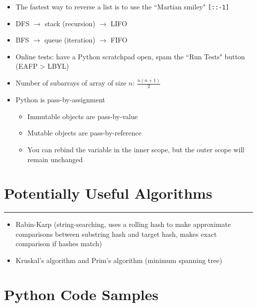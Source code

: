\documentclass[12pt]{article}
\begin{document}
\begin{itemize}
  \item The fastest way to reverse a list is to use the ``Martian smiley" \texttt{[::-1]}
  \item DFS $\rightarrow$ stack (recursion) $\rightarrow$ LIFO
  \item BFS $\rightarrow$ queue (iteration) $\rightarrow$ FIFO
  \item Online tests: have a Python scratchpad open, spam the ``Run Tests" button (EAFP > LBYL)
  \item Number of subarrays of array of size $n$: $\frac{n(n+1)}{2}$
  \item Python is pass-by-assignment
  \begin{itemize}
    \item Immutable objects are pass-by-value
    \item Mutable objects are pass-by-reference
    \item You can rebind the variable in the inner scope, but the outer scope will remain unchanged
  \end{itemize}
\end{itemize}

\section*{Potentially Useful Algorithms}
\hrule\vspace{5ex}

\begin{itemize}
  \item Rabin-Karp (string-searching, uses a rolling hash to make approximate comparisons between substring hash and target hash, makes exact comparison if hashes match)
  \item Kruskal's algorithm and Prim's algorithm (minimum spanning tree)
\end{itemize}

\appendix

\section{Python Code Samples}
\end{document}
